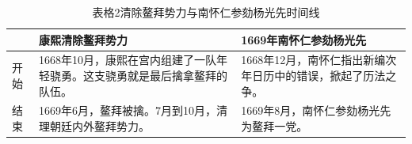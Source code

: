 \begin{table}[!htbp]\label{table-95}
\centering\BookTableStyle
\caption*{表格2\quad 清除鳌拜势力与南怀仁参劾杨光先时间线}
\begin{tabularx}{\linewidth}{>{\centering\arraybackslash}p{8mm}|>{\raggedright\arraybackslash}X|>{\raggedright\arraybackslash}X}
\hline
 & 康熙清除鳌拜势力 & 1669年南怀仁参劾杨光先 \\ \hline
开始 & 1668年10月，康熙在宫内组建了一队年轻骁勇。这支骁勇就是最后擒拿鳌拜的队伍。 & 1668年12月，南怀仁指出新编次年日历中的错误，掀起了历法之争。 \\ \hline
结束 & 1669年6月，鳌拜被擒。7月到10月，清理朝廷内外鳌拜势力。 & 1669年8月，南怀仁参劾杨光先为鳌拜一党。 \\ \hline
\end{tabularx}
\end{table}%
\FloatBarrier
